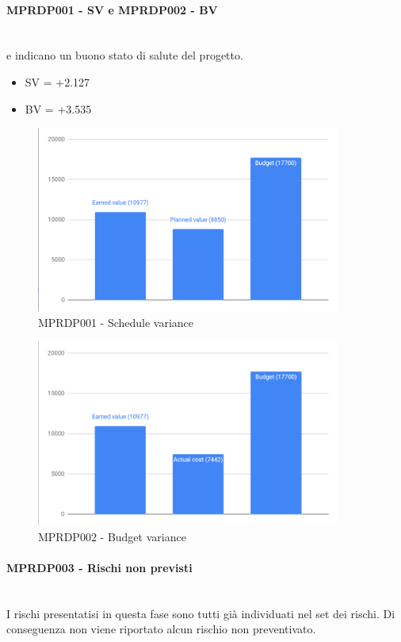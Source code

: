 \paragraph{MPRDP001 - SV e MPRDP002 -  BV}\mbox{}\\[0.4cm]
 e  indicano un buono stato di salute del progetto.
\begin{itemize}
\item SV = +2.127
\item BV = +3.535
\end{itemize}
\begin{figure}[H]
	\centering
	\includegraphics[width=10cm,keepaspectratio]{../includes/pics/SV.PNG}
	\caption{\label{fig:mission}MPRDP001 - Schedule variance}
\end{figure}
\begin{figure}[H]
	\centering
	\includegraphics[width=10cm,keepaspectratio]{../includes/pics/BV.PNG}
	\caption{\label{fig:mission}MPRDP002 - Budget variance}
\end{figure}
\paragraph{MPRDP003 - Rischi non previsti}\mbox{}\\[0.4cm]
I rischi presentatisi in questa fase sono tutti già individuati nel set dei rischi. Di conseguenza non viene riportato alcun rischio non preventivato.
